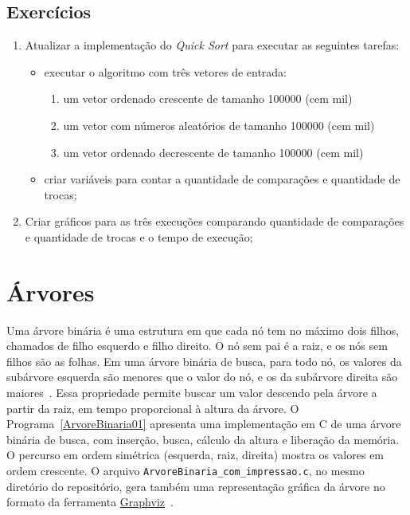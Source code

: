 \documentclass[11pt,fleqn]{book} %
\begin{document}
\subsection*{Exercícios}
\begin{enumerate}
	\item Atualizar a implementação do \textit{Quick Sort} para executar as seguintes tarefas:
	\begin{itemize}
		\item executar o algoritmo com três vetores de entrada:
		\begin{enumerate}
			\item um vetor ordenado crescente de tamanho 100000 (cem mil)
			\item um vetor com números aleatórios de tamanho 100000 (cem mil)
			\item um vetor ordenado decrescente de tamanho 100000 (cem mil)
		\end{enumerate} 
		\item criar variáveis para contar a quantidade de comparações e quantidade de trocas;
	\end{itemize} 
	\item Criar gráficos para as três execuções comparando quantidade de comparações e quantidade de trocas e o tempo de execução;
\end{enumerate} 

\newpage
\section{Árvores}\label{arvores}

Uma árvore binária é uma estrutura em que cada nó tem no máximo dois filhos, chamados de filho esquerdo e filho direito.
O nó sem pai é a raiz, e os nós sem filhos são as folhas.
Em uma árvore binária de busca, para todo nó, os valores da subárvore esquerda são menores que o valor do nó, e os da subárvore direita são maiores~\cite{cormen2009}.
Essa propriedade permite buscar um valor descendo pela árvore a partir da raiz, em tempo proporcional à altura da árvore.
O Programa~\ref{ArvoreBinaria01} apresenta uma implementação em C de uma árvore binária de busca, com inserção, busca, cálculo da altura e liberação da memória.
O percurso em ordem simétrica (esquerda, raiz, direita) mostra os valores em ordem crescente.
O arquivo \texttt{ArvoreBinaria\_com\_impressao.c}, no mesmo diretório do repositório, gera também uma representação gráfica da árvore no formato da ferramenta \href{https://graphviz.org/}{Graphviz}~\cite{Ellson03graphvizand}.
\end{document}

